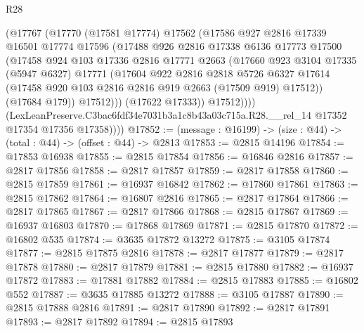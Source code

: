 \begin{lexlean}{R28}
\begin{coremodule}
                (@17767
                  (@17770
                    (@17581 @17774)
                    @17562
                    (@17586
                      @927
                      @2816
                      @17339
                      @16501
                      @17774
                      @17596
                      (@17488
                        @926
                        @2816
                        @17338
                        @6136
                        @17773
                        @17500
                        (@17458
                          @924
                          @103
                          @17336
                          @2816
                          @17771
                          @2663
                          (@17660
                            @923
                            @3104
                            @17335
                            (@5947 @6327)
                            @17771
                            (@17604
                              @922
                              @2816
                              @2818
                              @5726
                              @6327
                              @17614
                              (@17458 @920 @103 @2816 @2816 @919 @2663 (@17509 @919) @17512))
                            (@17684 @179))
                          @17512)))
                    (@17622 @17333))
                  @17512))))
          (LexLeanPreserve.C3bac6fdf34e7031b3a1c8b43a03c715a.R28.__rel_14
            @17352
            @17354
            @17356
            @17358))))
@17852 := (message : @16199) -> (size : @44) -> (total : @44) -> (offset : @44) -> @2813
@17853 := @2815 @14196
@17854 := @17853 @16938
@17855 := @2815 @17854
@17856 := @16846 @2816
@17857 := @2817 @17856
@17858 := @2817 @17857
@17859 := @2817 @17858
@17860 := @2815 @17859
@17861 := @16937 @16842
@17862 := @17860 @17861
@17863 := @2815 @17862
@17864 := @16807 @2816
@17865 := @2817 @17864
@17866 := @2817 @17865
@17867 := @2817 @17866
@17868 := @2815 @17867
@17869 := @16937 @16803
@17870 := @17868 @17869
@17871 := @2815 @17870
@17872 := @16802 @535
@17874 := @3635 @17872 @13272
@17875 := @3105 @17874
@17877 := @2815 @17875 @2816
@17878 := @2817 @17877
@17879 := @2817 @17878
@17880 := @2817 @17879
@17881 := @2815 @17880
@17882 := @16937 @17872
@17883 := @17881 @17882
@17884 := @2815 @17883
@17885 := @16802 @552
@17887 := @3635 @17885 @13272
@17888 := @3105 @17887
@17890 := @2815 @17888 @2816
@17891 := @2817 @17890
@17892 := @2817 @17891
@17893 := @2817 @17892
@17894 := @2815 @17893

\end{coremodule}
\end{lexlean}
